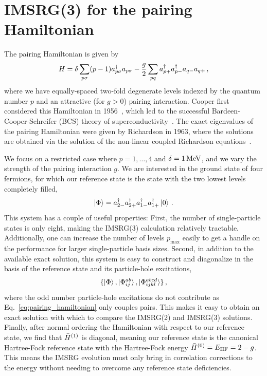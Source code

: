 \chapter{IMSRG(3) for the pairing Hamiltonian}\label{app:pairing_hamiltonian_imsrg3}

The pairing Hamiltonian is given by
\begin{equation}\label{eq:pairing_hamiltonian}
    H = \delta \sum_{p\sigma} (p - 1) a_{p\sigma}^{\dagger} a_{p\sigma}
    - \frac{g}{2} \sum_{p q} a_{p+}^{\dagger}a_{p-}^{\dagger} a_{q-} a_{q+}\,,
\end{equation}
where we have equally-spaced two-fold degenerate levels indexed by the quantum number $p$
and an attractive (for $g > 0$) pairing interaction.
Cooper first considered this Hamiltonian in 1956~\cite{Coop56pairing_hamiltonian},
which led to the successful Bardeen-Cooper-Schreifer (BCS) theory of superconductivity~\cite{Bard57bcs}.
The exact eigenvalues of the pairing Hamiltonian were given by Richardson in 1963,
where the solutions are obtained via the solution of the non-linear coupled Richardson equations~\cite{Rich63pairing_hamiltonian}.

We focus on a restricted case where $p=1,\ldots,4$ and $\delta=1\, \text{MeV}$,
and we vary the strength of the pairing interaction $g$.
We are interested in the ground state of four fermions,
for which our reference state is the state with the two lowest levels completely filled,
\begin{equation}\label{eq:pairing_hamiltonian_reference}
    \ket{\Phi} = a_{2-}^{\dagger}a_{2+}^{\dagger}a_{1-}^{\dagger}a_{1+}^{\dagger}\ket{0}\,.
\end{equation}
This system has a couple of useful properties:
First, the number of single-particle states is only eight,
making the IMSRG(3) calculation relatively tractable.
Additionally, one can increase the number of levels $p_{\text{max}}$ easily
to get a handle on the performance for larger single-particle basis sizes.
Second, in addition to the available exact solution,
this system is easy to construct and diagonalize in the basis
of the reference state and its particle-hole excitations,
\begin{equation}
    \{\ket{\Phi}, \ket{\Phi_{ij}^{ab}}, \ket{\Phi_{ijkl}^{abcd}} \}\,,
\end{equation}
where the odd number particle-hole excitations do not contribute
as Eq.~\eqref{eq:pairing_hamiltonian} only couples pairs.
This makes it easy to obtain an exact solution with which to compare the IMSRG(2)
and IMSRG(3) solutions.
Finally, after normal ordering the Hamiltonian with respect to our reference state,
we find that ${\bar{H}}^{(1)}$ is diagonal,
meaning our reference state is the canonical Hartree-Fock reference state
with the Hartree-Fock energy ${\bar{H}}^{(0)}=E_{\text{HF}}=2 - g$.
This means the IMSRG evolution must only bring in correlation corrections to the energy
without needing to overcome any reference state deficiencies.

